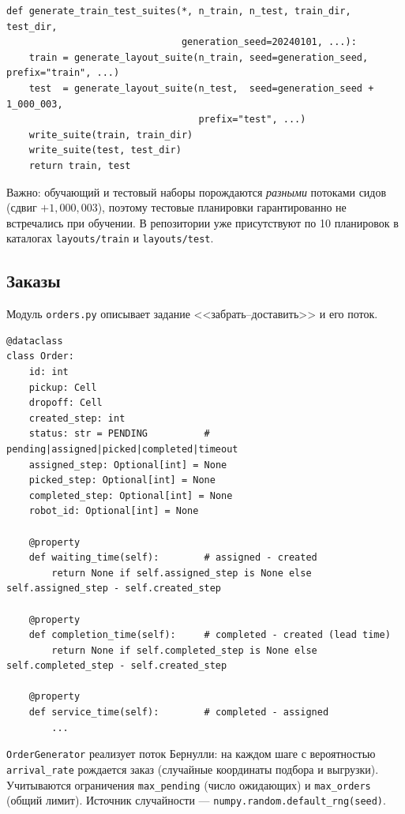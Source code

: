 \documentclass[11pt,a4paper]{article}
\newcommand{\code}[1]{\texttt{#1}}
\begin{document}
\begin{lstlisting}[style=py]
def generate_train_test_suites(*, n_train, n_test, train_dir, test_dir,
                               generation_seed=20240101, ...):
    train = generate_layout_suite(n_train, seed=generation_seed, prefix="train", ...)
    test  = generate_layout_suite(n_test,  seed=generation_seed + 1_000_003,
                                  prefix="test", ...)
    write_suite(train, train_dir)
    write_suite(test, test_dir)
    return train, test
\end{lstlisting}

Важно: обучающий и тестовый наборы порождаются \emph{разными} потоками сидов
(сдвиг $+1{,}000{,}003$), поэтому тестовые планировки гарантированно не
встречались при обучении. В репозитории уже присутствуют по 10 планировок в
каталогах \code{layouts/train} и \code{layouts/test}.

\subsection{Заказы}
Модуль \code{orders.py} описывает задание <<забрать--доставить>> и его поток.

\begin{lstlisting}[style=py]
@dataclass
class Order:
    id: int
    pickup: Cell
    dropoff: Cell
    created_step: int
    status: str = PENDING          # pending|assigned|picked|completed|timeout
    assigned_step: Optional[int] = None
    picked_step: Optional[int] = None
    completed_step: Optional[int] = None
    robot_id: Optional[int] = None

    @property
    def waiting_time(self):        # assigned - created
        return None if self.assigned_step is None else self.assigned_step - self.created_step

    @property
    def completion_time(self):     # completed - created (lead time)
        return None if self.completed_step is None else self.completed_step - self.created_step

    @property
    def service_time(self):        # completed - assigned
        ...
\end{lstlisting}

\code{OrderGenerator} реализует поток Бернулли: на каждом шаге с вероятностью
\code{arrival\_rate} рождается заказ (случайные координаты подбора и выгрузки).
Учитываются ограничения \code{max\_pending} (число ожидающих) и
\code{max\_orders} (общий лимит). Источник случайности — \code{numpy.random.default\_rng(seed)}.
\end{document}
